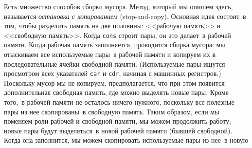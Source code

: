 Есть множество способов сборки мусора.  Метод, который мы
опишем здесь, называется
{\em остановка с копированием} (stop-and-copy).  Основная идея состоит~в том, чтобы разделить
память на две половины: <<рабочую память>> и <<свободную память>>.
Когда {\tt cons} строит пары, он это делает~в рабочей памяти.
Когда рабочая память заполняется, проводится сборка мусора: мы отыскиваем
все используемые пары~в рабочей памяти и копируем их в
последовательные ячейки свободной памяти. (Используемые пары ищутся
просмотром всех указателей {\tt car} и {\tt cdr},
начиная с машинных регистров.)  Поскольку мусор мы не копируем,
предполагается, что при этом появится дополнительная свободная память,
где можно выделять новые пары.  Кроме того,~в рабочей памяти
не осталось ничего нужного, поскольку все полезные пары из нее
скопированы~в свободную память.  Таким образом, если мы поменяем роли
рабочей и свободной памяти, мы можем продолжить работу; новые пары
будут выделяться~в новой рабочей памяти (бывшей свободной).  Когда
она заполнится, мы можем скопировать используемые пары из нее~в новую
